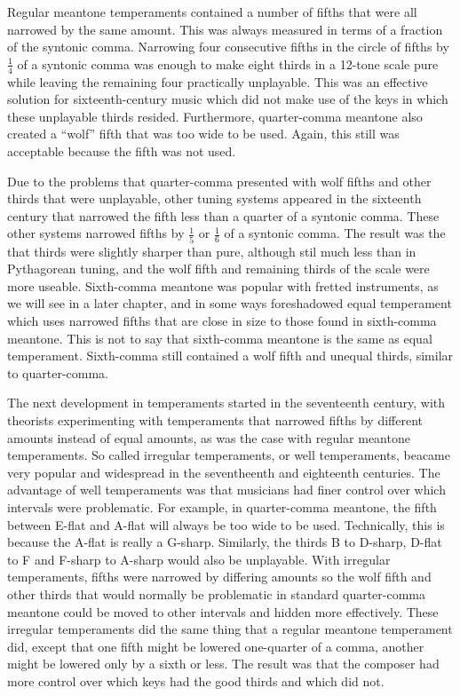 Regular meantone temperaments contained a number of fifths that were all narrowed by
the same amount. This was always measured in terms of a fraction of the syntonic comma.
Narrowing four consecutive fifths in the circle of fifths by $ \frac{1}{4} $
of a syntonic comma was enough to make eight thirds in a 12-tone scale pure while leaving the
remaining four practically unplayable.\autocite[33]{RD:1}  This was an
effective solution for sixteenth-century music which did not make use
of the keys in which these unplayable thirds resided.  Furthermore,
quarter-comma meantone also created a ``wolf'' fifth that was too wide to be used.
Again, this still was acceptable because the fifth was not used.

Due to the problems that quarter-comma presented with wolf fifths and other
thirds that were unplayable, other tuning systems appeared in the sixteenth
century that narrowed the fifth less than a quarter of a syntonic comma.  These
other systems narrowed fifths by $ \frac{1}{5} $ or $ \frac{1}{6} $ of a
syntonic comma.  The result was the that thirds were slightly sharper than pure,
although stil much less than in Pythagorean tuning, and the wolf fifth and
remaining thirds of the scale were more useable.  Sixth-comma meantone was
popular with fretted instruments, as we will see in a later chapter, and in some
ways foreshadowed equal temperament which uses narrowed fifths that are close in
size to those found in sixth-comma meantone.  This is not to say that
sixth-comma meantone is the same as equal temperament.  Sixth-comma still
contained a wolf fifth and unequal thirds, similar to quarter-comma.

The next development in temperaments started in the seventeenth century,
with theorists experimenting with temperaments that narrowed fifths by
different amounts instead of equal amounts, as was the case with regular meantone
temperaments.  So called irregular temperaments, or well temperaments,
beacame very popular and widespread in the seventheenth and eighteenth
centuries.  The advantage of well temperaments was that musicians had finer
control over which intervals were problematic.  For example, in quarter-comma
meantone, the fifth between E-flat and A-flat will always be too wide to be
used.  Technically, this is because the A-flat is really a G-sharp.
\autocite[35]{RD:1}  Similarly, the thirds B to D-sharp, D-flat to F and F-sharp
to A-sharp would also be unplayable.  With irregular temperaments,
fifths were narrowed by differing amounts so the wolf fifth and other thirds
that would normally be problematic in standard quarter-comma meantone could be
moved to other intervals and hidden more effectively.
These irregular temperaments did the same thing that a regular meantone
temperament did, except that one fifth might be lowered one-quarter
of a comma, another might be lowered only by a sixth or less.  The
result was that the composer had more control over which keys
had the good thirds and which did not.

